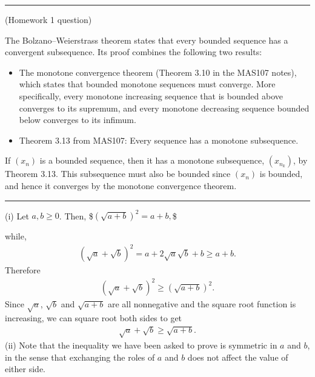 \documentclass[letterpaper,10pt,english]{jupyterBook}
\begin{document}
\bigskip\hrule\bigskip


\sphinxAtStartPar
{\hyperref[\detokenize{Problems:p3}]{}} (Homework 1 question)

\sphinxAtStartPar
The Bolzano–Weierstrass theorem states that every bounded sequence has a convergent subsequence. Its proof combines the following two results:
\begin{itemize}
\item {} 
\sphinxAtStartPar
The monotone convergence theorem (Theorem 3.10 in the MAS107 notes), which states that bounded monotone sequences must converge.  More specifically, every monotone increasing sequence that is bounded above converges to its supremum, and every monotone decreasing sequence bounded below converges to its infimum.

\item {} 
\sphinxAtStartPar
Theorem 3.13 from MAS107: Every sequence has a monotone subsequence.

\end{itemize}

\sphinxAtStartPar
{} 
If \((x_n)\) is a bounded sequence, then it has a monotone subsequence, \((x_{n_k})\), by Theorem 3.13. This subsequence must also be bounded since \((x_n)\) is bounded, and hence it converges by the monotone convergence theorem.


\bigskip\hrule\bigskip


\sphinxAtStartPar
{\hyperref[\detokenize{Problems:p4}]{}}(i) Let \(a, b \geq 0\). Then,
\$\(
\left(\sqrt{a+b}\right)^2 = a+b,
\)\$

\sphinxAtStartPar
while,
\begin{equation*}
\begin{split}
\left(\sqrt{a}+\sqrt{b}\right)^2 = a + 2\sqrt{a}\sqrt{b} + b \geq a+b.
\end{split}
\end{equation*}
\sphinxAtStartPar
Therefore
\begin{equation*}
\begin{split}
\left(\sqrt{a}+\sqrt{b}\right)^2 \geq \left(\sqrt{a+b}\right)^2.
\end{split}
\end{equation*}
\sphinxAtStartPar
Since \(\sqrt{a}\), \(\sqrt{b}\) and \(\sqrt{a+b}\) are all non\sphinxhyphen{}negative and the square root function is increasing, we can square root both sides to get
\begin{equation*}
\begin{split}
\sqrt{a}+\sqrt{b}\geq\sqrt{a+b}.
\end{split}
\end{equation*}
\sphinxAtStartPar
(ii)  Note that the inequality we have been asked to prove is symmetric in \(a\) and \(b\), in the sense that exchanging the roles of \(a\) and \(b\) does not affect the value of either side.
\end{document}
